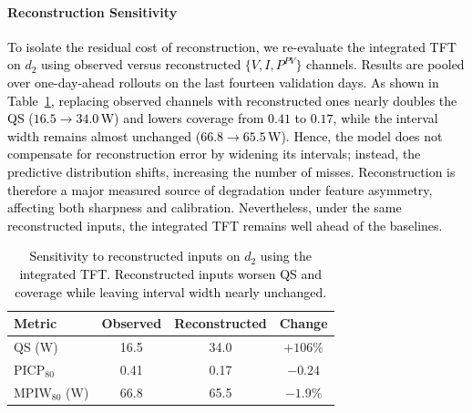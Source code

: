 \documentclass[final,10pt,1p,authoryear]{elsarticle}
\theoremstyle{definition}
\begin{document}
\paragraph{Reconstruction Sensitivity}
\textcolor{black}{To isolate the residual cost of reconstruction, we re-evaluate the integrated TFT on $d_2$ using observed versus reconstructed $\{V,I,P^{PV}\}$ channels. Results are pooled over one-day-ahead rollouts on the last fourteen validation days. As shown in Table~\ref{tab:sensitivity}, replacing observed channels with reconstructed ones nearly doubles the QS ($16.5\to34.0$\,W) and lowers coverage from $0.41$ to $0.17$, while the interval width remains almost unchanged ($66.8\to65.5$\,W). Hence, the model does not compensate for reconstruction error by widening its intervals; instead, the predictive distribution shifts, increasing the number of misses. Reconstruction is therefore a major measured source of degradation under feature asymmetry, affecting both sharpness and calibration. Nevertheless, under the same reconstructed inputs, the integrated TFT remains well ahead of the baselines.}
\begin{table}[!htbp]
\centering
\caption{\textcolor{black}{Sensitivity to reconstructed inputs on $d_2$ using the integrated TFT. Reconstructed inputs worsen QS and coverage while leaving interval width nearly unchanged.}}
\label{tab:sensitivity}
\begin{tabular}{lccc}
\toprule
Metric & Observed & Reconstructed & Change \\
\midrule
$\mathrm{QS}$ (W) & 16.5 & 34.0 & $+106\%$ \\
$\mathrm{PICP}_{80}$ & 0.41 & 0.17 & $-0.24$ \\
$\mathrm{MPIW}_{80}$ (W) & 66.8 & 65.5 & $-1.9\%$ \\
\bottomrule
\end{tabular}
\end{table}
\end{document}
